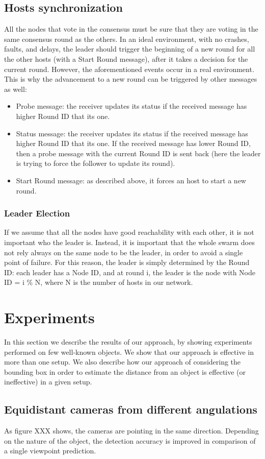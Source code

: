 \documentclass[10pt,conference,compsocconf]{IEEEtran}
\begin{document}
\subsection{Hosts synchronization}All the nodes that vote in the consensus must be sure that they are voting in the same consensus round as the others. In an ideal environment, with no crashes, faults, and delays, the leader should trigger the beginning of a new round for all the other hosts (with a Start Round message), after it takes a decision for the current round. However, the aforementioned events occur in a real environment. This is why the advancement to a new round can be triggered by other messages as well:
\begin{itemize}
\item Probe message: the receiver updates its status if the received message has higher Round ID that its one.
\item Status message: the receiver updates its status if the received message has higher Round ID that its one. If the received message has lower Round ID, then a probe message with the current Round ID is sent back (here the leader is trying to force the follower to update its round).
\item Start Round message: as described above, it forces an host to start a new round.
\end{itemize}
\subsubsection{Leader Election}
If we assume that all the nodes have good reachability with each other, it is not important who the leader is. Instead, it is important that the whole swarm does not rely always on the same node to be the leader, in order to avoid a single point of failure. For this reason, the leader is simply determined by the Round ID: each leader has a Node ID, and at round i, the leader is the node with Node ID = i \% N, where N is the number of hosts in our network.
\section{Experiments}
In this section we describe the results of our approach, by showing experiments performed on few well-known objects. We show that our approach is effective in more than one setup. We also describe how our approach of considering the bounding box in order to estimate the distance from an object is effective (or ineffective) in a given setup.
\subsection{Equidistant cameras from different angulations}
As figure XXX shows, the cameras are pointing in the same direction. Depending on the nature of the object, the detection accuracy is improved in comparison of a single viewpoint prediction. 
\end{document}
